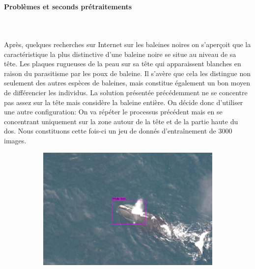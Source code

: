 \documentclass[12pt,a4paper]{report}
\begin{document}
\begin{spacing}{1.5}
\paragraph{Problèmes et seconds prétraitements}\mbox{}\\
\\
Après, quelques recherches sur Internet sur les baleines noires on s'aperçoit que la caractéristique la plus distinctive d'une baleine noire se situe au niveau de sa tête. Les plaques rugueuses de la peau sur sa tête qui apparaissent blanches en raison du parasitisme par les poux de baleine. Il s'avère que cela les distingue non seulement des autres espèces de baleines, mais constitue également un bon moyen de différencier les individus. La solution présentée précédemment ne se concentre pas assez sur la tête mais considère la baleine entière. On décide donc d'utiliser une autre configuration: On va répéter le processus précédent mais en se concentrant uniquement sur la zone autour de la tête et de la partie haute du dos.
Nous constituons cette fois-ci un jeu de donnés d'entraînement de 3000 images.
\\
\begin{figure}[H] %
\begin{subfigure}{0.45\textwidth}
\includegraphics[width=\linewidth]{figures/sortie/yolov3/predictionshead1.jpg}
\end{subfigure}\hspace*{\fill}
\begin{subfigure}{0.45\textwidth}

\end{subfigure}
\end{figure}
\end{spacing}
\end{document}
